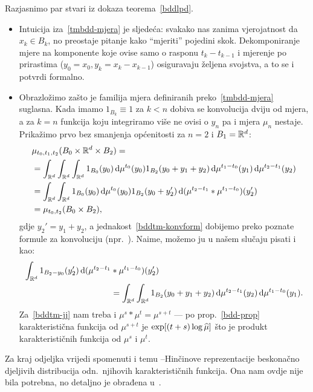 \documentclass[main.tex]{subfiles}
\begin{document}
\begin{komentar} \label{tmbdd-komentar}
	Razjasnimo par stvari iz dokaza teorema~\ref{bddlpd}.
	\begin{itemize}
		\item Intuicija iza~\eqref{tmbdd-mjera} je sljedeća: svakako nas zanima
		      vjerojatnost da \( x_k \in B_k \), no preostaje pitanje kako \enquote{mjeriti} pojedini skok.
		      Dekomponiranje mjere na komponente koje ovise samo o rasponu \( t_k-t_{k-1} \) i mjerenje po
		      prirastima (\( y_0=x_0, y_k = x_k-x_{k-1} \)) osiguravaju željena svojstva, a to se i
		      potvrdi formalno.

		\item Obrazložimo zašto je familija mjera definiranih preko~\eqref{tmbdd-mjera} suglasna.
		      Kada imamo \( 1_{B_k} \equiv 1 \) za \( k < n \) dobiva se konvolucija dviju od mjera, a za \( k = n \)
		      funkcija koju integriramo više ne ovisi o \( y_n \) pa i mjera \( \mu_n \) nestaje. Prikažimo prvo bez smanjenja općenitosti za \( n = 2 \) i \( B_1 = \mathbb{R}^d \):
		      \begin{align}
			       & \mu_{t_0, t_1, t_2}(B_0 \times \mathbb{R}^d \times B_2) =                                                                                         \\
			       & = \int_{\mathbb{R}^d}\int_{\mathbb{R}^d}\int_{\mathbb{R}^d} 1_{B_0}(y_0) \,\mathrm d \mu^{t_0} (y_0) 1_{B_2}(y_0+y_1+y_2) \,\mathrm d \mu^{t_1-t_0}(y_1) \,\mathrm d \mu^{t_2-t_1}(y_2)      \\
			       & = \int_{\mathbb{R}^d} \int_{\mathbb{R}^d} 1_{B_0}(y_0) \,\mathrm d \mu^{t_0}(y_0) 1_{B_2}(y_0+y_2') \,\mathrm d (\mu^{t_2-t_1}*\mu^{t_1-t_0})(y_2')  \label{bddtm-konvform} \\
			       & = \mu_{t_0, t_2}(B_0 \times B_2) \label{bddtm-jj},
		      \end{align}
		      gdje \( y_2' = y_1 + y_2 \), a jednakost~\eqref{bddtm-konvform} dobijemo preko poznate formule za konvoluciju (npr.~\cite[,~(6)]{sarapa}). Naime, možemo ju u našem slučaju pisati
		      i kao:
		      \begin{equation}
			      \begin{aligned}
				      \int_{\mathbb{R}^d} 1_{B_2-y_0} (y_2')\,\mathrm d (\mu^{t_2-t_1} & * \mu^{t_1-t_0})(y_2')                                                                       \\
				                                                      & =  \int_{\mathbb{R}^d} \int_{\mathbb{R}^d} 1_{B_2}(y_0+y_1+y_2) \,\mathrm d \mu^{t_2-t_1}(y_2) \,\mathrm d \mu^{t_1-t_0}(y_1).
			      \end{aligned}
		      \end{equation}
		      Za~\eqref{bddtm-jj} nam treba i \( \mu^s * \mu^t = \mu^{s+t} \) --- po prop.~\ref{bdd-prop} karakteristična funkcija od
		      \( \mu^{s+t} \) je \( \exp[(t+s) \log \widehat{\mu}] \) što je produkt karakterističnih funkcija od \( \mu^s \) i \( \mu^t \).
	\end{itemize}
\end{komentar}

Za kraj odjeljka vrijedi spomenuti i temu \levy --Hinčinove reprezentacije beskonačno djeljivih distribucija odn.\
njihovih karakterističnih funkcija. Ona nam ovdje nije bila potrebna, no detaljno je
obrađena u~\cite[\textsection 8]{sato}.
\end{document}
